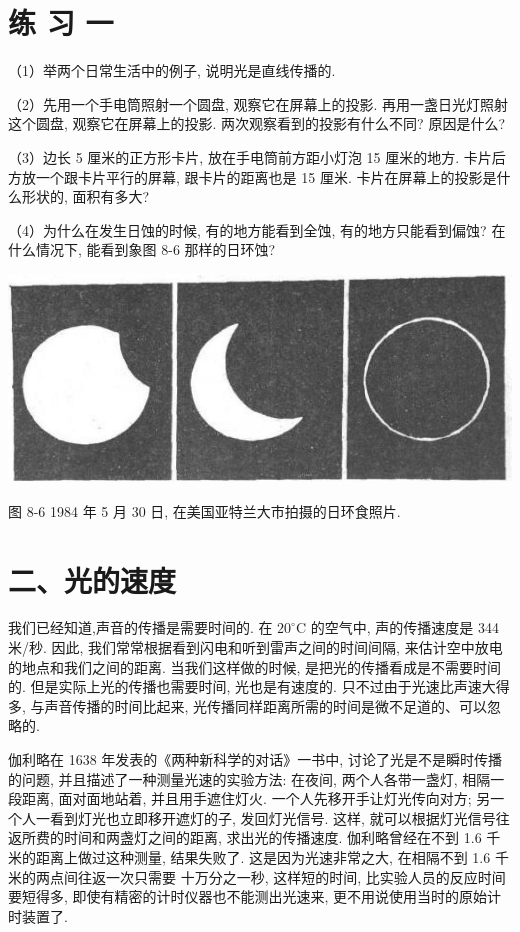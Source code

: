 \documentclass[10pt]{article}
\begin{document}
\section*{练 习 一}

（1）举两个日常生活中的例子, 说明光是直线传播的.

（2）先用一个手电筒照射一个圆盘, 观察它在屏幕上的投影. 再用一盏日光灯照射这个圆盘, 观察它在屏幕上的投影. 两次观察看到的投影有什么不同? 原因是什么?

（3）边长 5 厘米的正方形卡片, 放在手电筒前方距小灯泡 15 厘米的地方. 卡片后方放一个跟卡片平行的屏幕, 跟卡片的距离也是 15 厘米. 卡片在屏幕上的投影是什么形状的, 面积有多大?

（4）为什么在发生日蚀的时候, 有的地方能看到全蚀, 有的地方只能看到偏蚀? 在什么情况下, 能看到象图 8-6 那样的日环蚀?

\begin{center}
\includegraphics[max width=1.0\textwidth]{images/01913056-1f15-74d8-9184-9aab52c9d66b_247_614856.jpg}
\end{center}

图 8-6 1984 年 5 月 30 日, 在美国亚特兰大市拍摄的日环食照片.

\section*{二、光的速度}

我们已经知道,声音的传播是需要时间的. 在 \({20}^{ \circ }\mathrm{C}\) 的空气中, 声的传播速度是 344 米/秒. 因此, 我们常常根据看到闪电和听到雷声之间的时间间隔, 来估计空中放电的地点和我们之间的距离. 当我们这样做的时候, 是把光的传播看成是不需要时间的. 但是实际上光的传播也需要时间, 光也是有速度的. 只不过由于光速比声速大得多, 与声音传播的时间比起来, 光传播同样距离所需的时间是微不足道的、可以忽略的.

伽利略在 1638 年发表的《两种新科学的对话》一书中, 讨论了光是不是瞬时传播的问题, 并且描述了一种测量光速的实验方法: 在夜间, 两个人各带一盏灯, 相隔一段距离, 面对面地站着, 并且用手遮住灯火. 一个人先移开手让灯光传向对方; 另一个人一看到灯光也立即移开遮灯的子, 发回灯光信号. 这样, 就可以根据灯光信号往返所费的时间和两盏灯之间的距离, 求出光的传播速度. 伽利略曾经在不到 1.6 千米的距离上做过这种测量, 结果失败了. 这是因为光速非常之大, 在相隔不到 1.6 千米的两点间往返一次只需要 十万分之一秒, 这样短的时间, 比实验人员的反应时间要短得多, 即使有精密的计时仪器也不能测出光速来, 更不用说使用当时的原始计时装置了.
\end{document}
